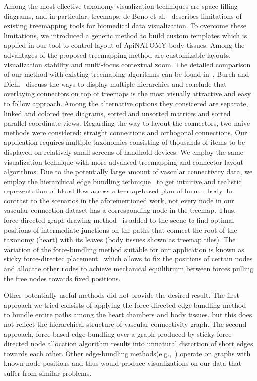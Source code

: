 Among the most effective taxonomy visualization techniques are space-filling diagrams, and in particular, treemaps.
de Bono et al.~\cite{BGS12} describes limitations of existing treemapping tools for biomedical data visualization. To overcome these limitations, we introduced a generic method to build custom templates which is applied in our tool to control layout of ApiNATOMY body tissues. Among the advantages of the proposed treemapping method are customizable layouts, visualization stability and multi-focus contextual zoom. The detailed comparison of our method with existing treemaping algorithms can be found in~\cite{KBK14}.
Burch and Diehl~\cite{BD06} discuss the ways to display multiple hierarchies and conclude that overlaying connectors on top of treemaps is the most visually attractive and easy to follow approach. Among the alternative options they considered are separate, linked and colored tree diagrams, sorted and unsorted matrices and sorted parallel coordinate views. Regarding the way to layout the connectors, two naive methods were considered: straight connections and orthogonal connections. %
Our application requires multiple taxonomies consisting of thousands of items to be displayed on relatively small screens of handhold devices. We employ the same visualization technique with more advanced treemapping and connector layout algorithms. Due to the potentially large amount of vascular connectivity data, we employ the hierarchical edge bundling technique~\cite{Hol06} to get intuitive and realistic representation of blood flow across a teemap-based plan of human body.
In contrast to the scenarios in the aforementioned work, not every node in our vascular connection dataset has a corresponding node in the treemap. Thus, force-directed graph drawing method~\cite{BET+99} is added to the scene to find optimal positions of intermediate junctions on the paths that connect the root of the taxonomy (heart) with its leaves (body tissues shown as treemap tiles). The variation of the force-bundling method suitable for our application is known as sticky force-directed placement~\cite{FR91} which allows to fix the positions of certain nodes and allocate other nodes to achieve mechanical equilibrium between forces pulling the free nodes towards fixed positions.

%
Other potentially useful methods did not provide the desired result. The first approach we tried consists of applying the
force-directed edge bundling method~\cite{HW09} to bundle entire paths among the heart chambers and body tissues, but this does not reflect the hierarchical structure of vascular connectivity graph. The second approach, force-based edge bundling over a graph produced by sticky force-directed node allocation algorithm results into unnatural distortion of short edges towards each other. Other edge-bundling methods(e.g.,~\cite{GHN+11,HET12,SHH11}) operate on graphs with known node positions and thus would produce visualizations on our data that suffer from similar problems.

